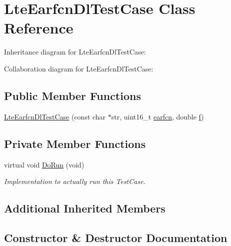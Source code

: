 \hypertarget{classLteEarfcnDlTestCase}{}\section{Lte\+Earfcn\+Dl\+Test\+Case Class Reference}
\label{classLteEarfcnDlTestCase}


Inheritance diagram for Lte\+Earfcn\+Dl\+Test\+Case\+:


Collaboration diagram for Lte\+Earfcn\+Dl\+Test\+Case\+:
\subsection*{Public Member Functions}
\begin{DoxyCompactItemize}
\item 
\hyperlink{classLteEarfcnDlTestCase_ac759fd255cf7fbae39839b6bcf5820bd}{Lte\+Earfcn\+Dl\+Test\+Case} (const char $\ast$str, uint16\+\_\+t \hyperlink{generate__test__data__lte__spectrum__value__txpsd_8m_a584be7562abb392609629331f8c6c42c}{earfcn}, double \hyperlink{80211b_8c_ae7ffc1a8f84fa47a0812b2f2b9627132}{f})
\end{DoxyCompactItemize}
\subsection*{Private Member Functions}
\begin{DoxyCompactItemize}
\item 
virtual void \hyperlink{classLteEarfcnDlTestCase_aa7c00fe2e700373e62e5760c8dd3700c}{Do\+Run} (void)
\begin{DoxyCompactList}\small\item\em Implementation to actually run this Test\+Case. \end{DoxyCompactList}\end{DoxyCompactItemize}
\subsection*{Additional Inherited Members}


\subsection{Constructor \& Destructor Documentation}
